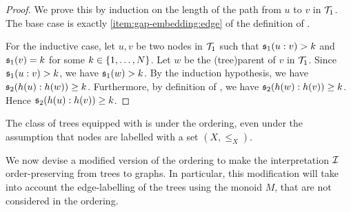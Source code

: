 \begin{proof}
  We prove this by induction on the length of the path 
  from $u$ to $v$ in $\t_1$. The base case is exactly 
  \cref{item:gap-embedding:edge} of the definition of .

  For the inductive case, let $u, v$ be two nodes in $\t_1$
  such that $\mathfrak{s}_1(u:v) > k$ and $\mathfrak{s}_1(v) = k$ for some $k \in \{ 1, \dots, N \}$.
  Let $w$ be the \kl(tree){parent} of $v$ in $\t_1$.
  Since $\mathfrak{s}_1(u:v) > k$, we have $\mathfrak{s}_1(w) > k$.
  By the induction hypothesis, we have $\mathfrak{s}_2(h(u):h(w)) \geq k$.
  Furthermore, by definition of , we have $\mathfrak{s}_2(h(w):h(v)) \geq k$.
  Hence $\mathfrak{s}_2(h(u):h(v)) \geq k$.
\end{proof}



\begin{theorem}
  \label{thm:gap-embedding-wqo}
  The class of trees equipped with 
  is  under the  ordering,
  even under the assumption that nodes are labelled with a  set $(X, \leq_X)$.
\end{theorem}

\AP We now devise a modified version of the 
ordering to make the interpretation $\mathcal{I}$ order-preserving from trees
to graphs. In particular, this modification will take into account the
edge-labelling of the trees using the monoid $M$, that are not considered in
the  ordering.

\newcommand{\marked}{\mathbf{M}}
\newcommand{\separating}{\mathbf{S}}
\newcommand{\dummy}{\mathbf{D}}
\newcommand{\marking}{\rho}

